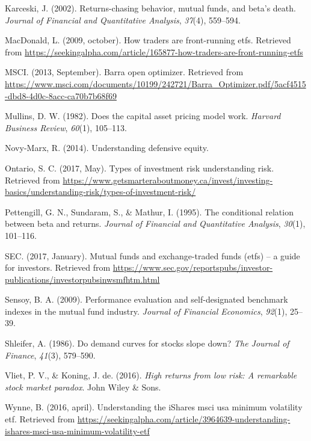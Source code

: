 \documentclass[12pt,twoside]{reedthesis}
\theoremstyle{definition}
\theoremstyle{definition}
\theoremstyle{definition}
\theoremstyle{remark}
\begin{document}
\hypertarget{ref-karceski2002}{}
Karceski, J. (2002). Returns-chasing behavior, mutual funds, and beta's
death. \emph{Journal of Financial and Quantitative Analysis},
\emph{37}(4), 559--594.

\hypertarget{ref-macdonald2009}{}
MacDonald, L. (2009, october). How traders are front-running etfs.
Retrieved from
\url{https://seekingalpha.com/article/165877-how-traders-are-front-running-etfs}

\hypertarget{ref-msci2013}{}
MSCI. (2013, September). Barra open optimizer. Retrieved from
\url{https://www.msci.com/documents/10199/242721/Barra_Optimizer.pdf/5acf4515-dbd8-4d0c-8acc-ca70b7b68f69}

\hypertarget{ref-mullins1982}{}
Mullins, D. W. (1982). Does the capital asset pricing model work.
\emph{Harvard Business Review}, \emph{60}(1), 105--113.

\hypertarget{ref-novy2014}{}
Novy-Marx, R. (2014). Understanding defensive equity.

\hypertarget{ref-ontario2017}{}
Ontario, S. C. (2017, May). Types of investment risk \textbar{}
understanding risk. Retrieved from
\url{https://www.getsmarteraboutmoney.ca/invest/investing-basics/understanding-risk/types-of-investment-risk/}

\hypertarget{ref-pettengill1995}{}
Pettengill, G. N., Sundaram, S., \& Mathur, I. (1995). The conditional
relation between beta and returns. \emph{Journal of Financial and
Quantitative Analysis}, \emph{30}(1), 101--116.

\hypertarget{ref-sec2017}{}
SEC. (2017, January). Mutual funds and exchange-traded funds (etfs) -- a
guide for investors. Retrieved from
\url{https://www.sec.gov/reportspubs/investor-publications/investorpubsinwsmfhtm.html}

\hypertarget{ref-sensoy2009}{}
Sensoy, B. A. (2009). Performance evaluation and self-designated
benchmark indexes in the mutual fund industry. \emph{Journal of
Financial Economics}, \emph{92}(1), 25--39.

\hypertarget{ref-shleifer1986}{}
Shleifer, A. (1986). Do demand curves for stocks slope down? \emph{The
Journal of Finance}, \emph{41}(3), 579--590.

\hypertarget{ref-van2016}{}
Vliet, P. V., \& Koning, J. de. (2016). \emph{High returns from low
risk: A remarkable stock market paradox}. John Wiley \& Sons.

\hypertarget{ref-wynne2016}{}
Wynne, B. (2016, april). Understanding the iShares msci usa minimum
volatility etf. Retrieved from
\url{https://seekingalpha.com/article/3964639-understanding-ishares-msci-usa-minimum-volatility-etf}


\end{document}
